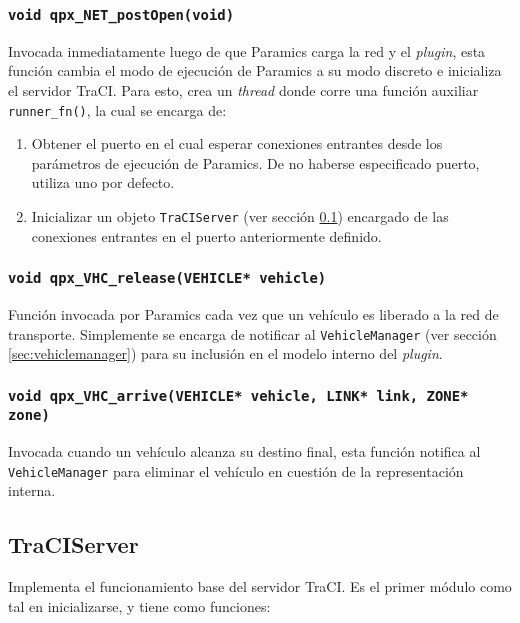 \subsubsection{\texttt{void qpx\_NET\_postOpen(void)}}\label{sec:qpx_postopen}

Invocada inmediatamente luego de que Paramics carga la red y el \emph{plugin}, esta función cambia el modo de ejecución de Paramics a su modo discreto e inicializa el servidor TraCI. Para esto, crea un \emph{thread} donde corre una función auxiliar \texttt{runner\_fn()}, la cual se encarga de:

\begin{enumerate}
    \item Obtener el puerto en el cual esperar conexiones entrantes desde los parámetros de ejecución de Paramics. De no haberse especificado puerto, utiliza uno por defecto.
    \item Inicializar un objeto \texttt{TraCIServer} (ver sección \ref{sec:traciserver}) encargado de las conexiones entrantes en el puerto anteriormente definido.
\end{enumerate}

\subsubsection{\texttt{void qpx\_VHC\_release(VEHICLE* vehicle)}}

Función invocada por Paramics cada vez que un vehículo es liberado a la red de transporte. Simplemente se encarga de notificar al \texttt{VehicleManager} (ver sección \ref{sec:vehiclemanager}) para su inclusión en el modelo interno del \emph{plugin}.

\subsubsection{\texttt{void qpx\_VHC\_arrive(VEHICLE* vehicle, LINK* link, ZONE* zone)}}

Invocada cuando un vehículo alcanza su destino final, esta función notifica al \texttt{VehicleManager} para eliminar el vehículo en cuestión de la representación interna.

\subsection{TraCIServer}\label{sec:traciserver}

Implementa el funcionamiento base del servidor TraCI. Es el primer módulo como tal en inicializarse, y tiene como funciones:

